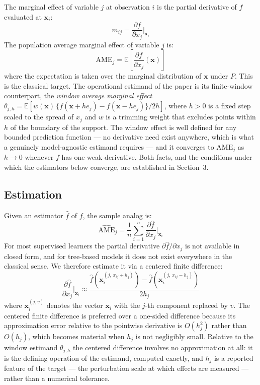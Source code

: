 \documentclass[12pt]{article}
\begin{document}
	The marginal effect of variable $j$ at observation $i$ is the partial derivative of $f$ evaluated at $\mathbf{x}_i$:
	\begin{equation}
		m_{ij} = \frac{\partial f}{\partial x_j}\bigg|_{\mathbf{x}_i}
	\end{equation}
	The population average marginal effect of variable $j$ is:
	\begin{equation}
		\mathrm{AME}_j = \mathbb{E}\left[\frac{\partial f}{\partial x_j}(\mathbf{x})\right]
	\end{equation}
	where the expectation is taken over the marginal distribution of $\mathbf{x}$ under $P$. This is the classical target. The operational estimand of the paper is its finite-window counterpart, the \emph{window average marginal effect} $\theta_{j,h} = \mathbb{E}[w(\mathbf{x})\,\{f(\mathbf{x} + h e_j) - f(\mathbf{x} - h e_j)\}/2h]$, where $h > 0$ is a fixed step scaled to the spread of $x_j$ and $w$ is a trimming weight that excludes points within $h$ of the boundary of the support. The window effect is well defined for any bounded prediction function --- no derivative need exist anywhere, which is what a genuinely model-agnostic estimand requires --- and it converges to $\mathrm{AME}_j$ as $h \to 0$ whenever $f$ has one weak derivative. Both facts, and the conditions under which the estimators below converge, are established in Section~3.
	
	\subsection{Estimation}
	
	Given an estimator $\hat{f}$ of $f$, the sample analog is:
	\begin{equation}
		\widehat{\mathrm{AME}}_j = \frac{1}{n} \sum_{i=1}^n \frac{\partial \hat{f}}{\partial x_j}\bigg|_{\mathbf{x}_i}
	\end{equation}
	For most supervised learners the partial derivative $\partial \hat{f} / \partial x_j$ is not available in closed form, and for tree-based models it does not exist everywhere in the classical sense. We therefore estimate it via a centered finite difference:
	\begin{equation}
		\frac{\partial \hat{f}}{\partial x_j}\bigg|_{\mathbf{x}_i} \approx \frac{\hat{f}\!\left(\mathbf{x}_i^{(j,\, x_{ij} + h_j)}\right) - \hat{f}\!\left(\mathbf{x}_i^{(j,\, x_{ij} - h_j)}\right)}{2h_j}
	\end{equation}
	where $\mathbf{x}_i^{(j,v)}$ denotes the vector $\mathbf{x}_i$ with the $j$-th component replaced by $v$. The centered finite difference is preferred over a one-sided difference because its approximation error relative to the pointwise derivative is $O(h_j^2)$ rather than $O(h_j)$, which becomes material when $h_j$ is not negligibly small. Relative to the window estimand $\theta_{j,h}$ the centered difference involves no approximation at all: it is the defining operation of the estimand, computed exactly, and $h_j$ is a reported feature of the target --- the perturbation scale at which effects are measured --- rather than a numerical tolerance.
	
\end{document}

